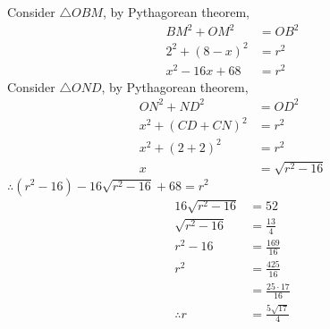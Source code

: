 \documentclass[varwidth=70mm]{standalone}
\begin{document}
\begin{answer}
Consider $\bigtriangleup OBM$, by Pythagorean theorem,
\begin{equation*}
\begin{aligned}
BM^2 + OM^2 &= OB^2 \\
2^2 + (8-x)^2 &= r^2 \\
x^2 - 16x + 68 &= r^2
\end{aligned}
\end{equation*}
Consider $\bigtriangleup OND$, by Pythagorean theorem,
\begin{equation*}
\begin{aligned}
ON^2 + ND^2 &= OD^2 \\
x^2 + (CD+CN)^2 &= r^2 \\
x^2 + (2+2)^2 &= r^2 \\
x &= \sqrt{r^2 - 16}
\end{aligned}
\end{equation*}
$\therefore (r^2 - 16) - 16\sqrt{r^2 - 16} + 68 = r^2$
\begin{equation*}
\begin{aligned}
16\sqrt{r^2 - 16} &= 52 \\
\sqrt{r^2 - 16} &= \frac{13}{4} \\
r^2 - 16 &= \frac{169}{16} \\
r^2 &= \frac{425}{16} \\
	&= \frac{25\cdot 17}{16} \\
\therefore r &= \frac{5\sqrt{17}}{4}
\end{aligned}
\end{equation*}

\end{answer}
\end{document}
